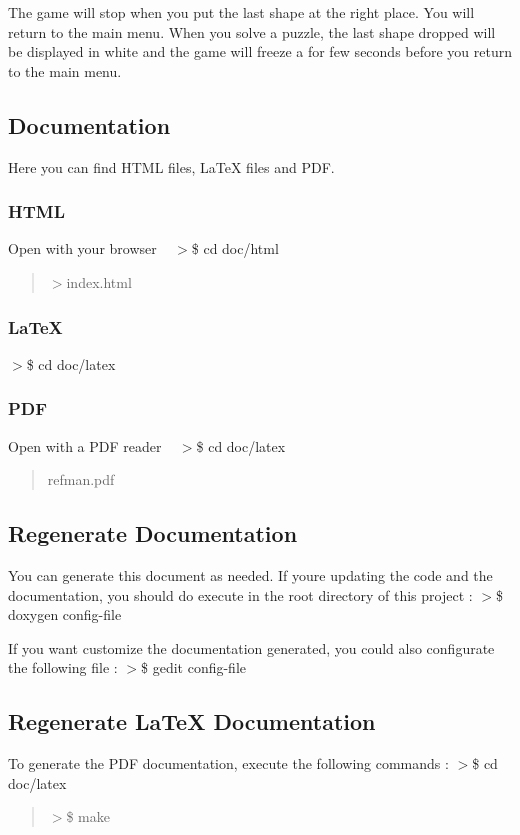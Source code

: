 The game will stop when you put the last shape at the right place. You will return to the main menu. When you solve a puzzle, the last shape dropped will be displayed in white and the game will freeze a for few seconds before you return to the main menu.

\subsection*{Documentation}

Here you can find H\+T\+ML files, La\+TeX files and P\+DF. \subsubsection*{H\+T\+ML}

Open with your browser ~\newline
 $>$\$ cd doc/html \begin{quote}


$>$index.\+html \end{quote}
\subsubsection*{La\+TeX}

$>$\$ cd doc/latex \subsubsection*{P\+DF}

Open with a P\+DF reader ~\newline
 $>$\$ cd doc/latex \begin{quote}


refman.\+pdf \end{quote}


\subsection*{Regenerate Documentation}

You can generate this document as needed. If you\textquotesingle{}re updating the code and the documentation, you should do execute in the root directory of this project \+: $>$\$ doxygen config-\/file

If you want customize the documentation generated, you could also configurate the following file \+: $>$\$ gedit config-\/file

\subsection*{Regenerate La\+TeX Documentation}

To generate the P\+DF documentation, execute the following commands \+: $>$\$ cd doc/latex \begin{quote}


$>$\$ make\end{quote}
